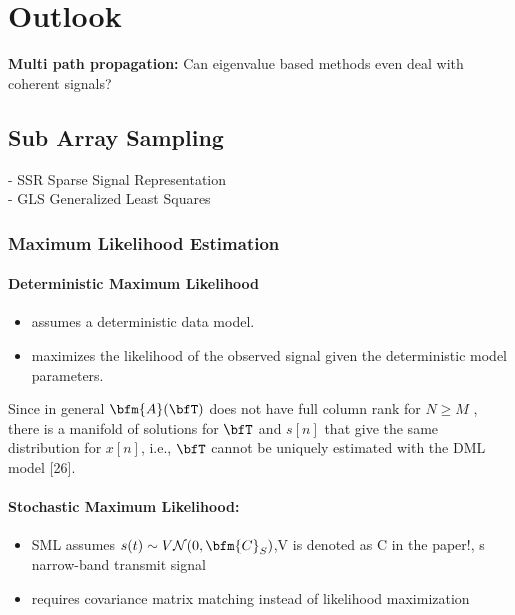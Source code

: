 \chapter{Outlook}
\label{ch:outlook}



\textbf{Multi path propagation:} Can eigenvalue based methods even deal with coherent signals?\\


\section{Sub Array Sampling}


- SSR Sparse Signal Representation\\
- GLS Generalized Least Squares\\

\subsection{Maximum Likelihood Estimation}


\subsubsection{Deterministic Maximum Likelihood}
\begin{itemize}
    \item assumes a deterministic data model.
    \item maximizes the likelihood of the observed signal given the deterministic model parameters.
\end{itemize}
Since in general \( \bfm{A}(\bfT) \) does not have full column rank for \( N \ge M \) , there is a manifold of solutions for \( \bfT \) and \( s[n] \) that
give the same distribution for \( x[n] \), i.e., \( \bfT \) cannot be uniquely
estimated with the DML model [26].

\subsubsection{Stochastic Maximum Likelihood:}
\begin{itemize}
    \item SML assumes \( s(t) \sim V\mathcal{N}(0,\bfm{C}_S) \),V is denoted as C in the paper!, s narrow-band transmit signal
    \item requires covariance matrix matching instead of likelihood maximization
\end{itemize}


